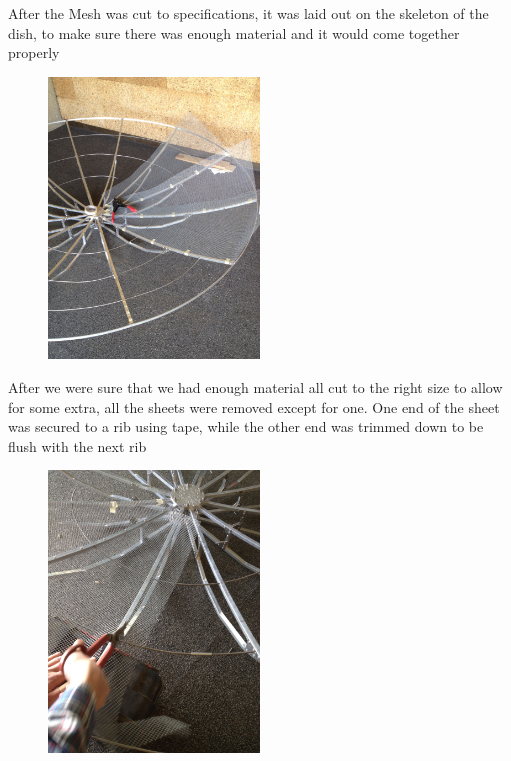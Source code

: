 \documentclass[11pt]{article} %
\begin{document}
After the Mesh was cut to specifications, it was laid out on the skeleton of the dish, to make sure there was enough material and it would come together properly

\begin{figure}
  \centering
  \caption{   }
  \includegraphics[width=0.50\textwidth]{dish/12.jpeg}
\end{figure}

After we were sure that we had enough material all cut to the right size to allow for some extra, all the sheets were removed except for one. One end of the sheet was secured to a rib using tape, while the other end was trimmed down to be flush with the next rib

\begin{figure}
  \centering
  \caption{   }
  \includegraphics[width=0.50\textwidth]{dish/13.jpeg}
\end{figure}
\end{document}

